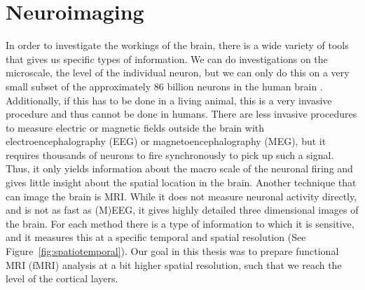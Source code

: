 \section*{Neuroimaging}
In order to investigate the workings of the brain, there is a wide variety of tools that gives us specific types of information. We can do investigations on the microscale, the level of the individual neuron, but we can only do this on a very small subset of the approximately 86 billion neurons in the human brain \cite{Herculano-Houzel2009}. Additionally, if this has to be done in a living animal, this is a very invasive procedure and thus cannot be done in humans. There are less invasive procedures to measure electric or magnetic fields outside the brain with electroencephalography (EEG) or magnetoencephalography (MEG), but it requires thousands of neurons to fire synchronously to pick up such a signal. Thus, it only yields information about the macro scale of the neuronal firing and gives little insight about the spatial location in the brain. Another technique that can image the brain is MRI. While it does not measure neuronal activity directly, and is not as fast as (M)EEG, it gives highly detailed three dimensional images of the brain. For each method there is a type of information to which it is sensitive, and it measures this at a specific temporal and spatial resolution (See Figure~\ref{fig:spatiotemporal}). Our goal in this thesis was to prepare functional MRI (fMRI) analysis at a bit higher spatial resolution, such that we reach the level of the cortical layers.


